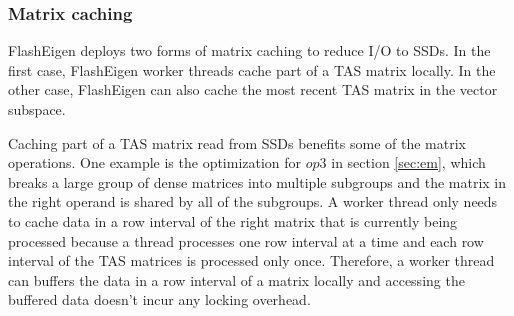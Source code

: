 


\subsubsection{Matrix caching}
FlashEigen deploys two forms of matrix caching to reduce I/O to SSDs.
In the first case, FlashEigen worker threads cache part of a TAS
matrix locally. In the other case, FlashEigen can also cache the most recent
TAS matrix in the vector subspace.

Caching part of a TAS matrix read from SSDs benefits some of
the matrix operations. One example is the optimization for $op3$ in section
\ref{sec:em}, which breaks a large group of dense matrices into multiple
subgroups and the matrix in the right operand is shared by all of the subgroups.
A worker thread only needs to cache data in a row interval of the right matrix
that is currently being processed because a thread processes one row interval
at a time and each row interval of the TAS matrices is processed only once.
Therefore, a worker thread can buffers the data in a row interval of a matrix
locally and accessing the buffered data doesn't incur any locking overhead.

